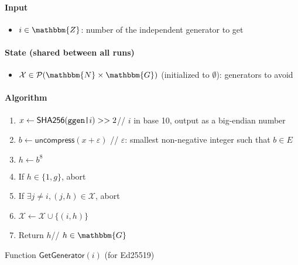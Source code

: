 \documentclass[a4paper]{article}
\newcommand{\G}{\mathbbm{G}}
\newcommand{\Z}{\mathbbm{Z}}
\newcommand{\N}{\mathbbm{N}}
\newcommand{\shatwo}{\textsf{SHA256}}
\begin{document}
\begin{table}
  \begin{framed}
    \noindent\paragraph{Input}
    \begin{itemize}
    \item $i\in\Z$: number of the independent generator to get
    \end{itemize}
    \noindent\paragraph{State (shared between all runs)}
    \begin{itemize}
    \item $\mathcal{X}\in\mathcal{P}(\N\times\G)$ (initialized to
      $\emptyset$): generators to avoid
    \end{itemize}
    \noindent\paragraph{Algorithm}
    \begin{enumerate}
    \item $x\leftarrow\shatwo(\verb=ggen|=i)>>2$\hfill// $i$ in base 10,
      output as a big-endian number
    \item $b\leftarrow\textsf{uncompress}(x+\varepsilon)$
      \hfill// $\varepsilon$: smallest non-negative integer such that
      $b\in E$
    \item $h\leftarrow b^8$
    \item If $h\in\{1,g\}$, abort
    \item If $\exists j\neq i, (j,h)\in\mathcal{X}$, abort
    \item $\mathcal{X}\leftarrow\mathcal{X}\cup\{(i,h)\}$
    \item Return $h$\hfill// $h\in\G$
    \end{enumerate}
  \end{framed}
  \caption{Function $\mathsf{GetGenerator}(i)$ (for Ed25519)}
  \label{get-generator-ed25519}
\end{table}
\end{document}
